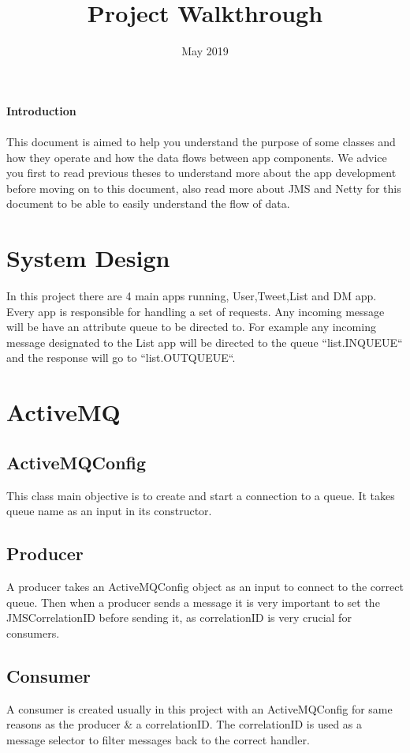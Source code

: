\documentclass{article}
\title{Project Walkthrough}
\date{May 2019}
\begin{document}
\maketitle

\paragraph{\huge Introduction}
\paragraph{}
This document is aimed to help you understand the purpose of some classes and how they operate and how the data flows between app components. We advice you first to read previous theses to understand more about the app development before moving on to this document, also read more about JMS and Netty for this document to be able to easily understand the flow of data.


\section{System Design}
In this project there are 4 main apps running, User,Tweet,List and DM app. Every app is responsible for handling a set of requests. Any incoming message will be have an attribute queue to be directed to. For example any incoming message designated to the List app will be directed to the queue ``list.INQUEUE`` and the response will go to ``list.OUTQUEUE``.

\section{ActiveMQ}
\subsection{ActiveMQConfig}
This class main objective is to create and start a connection to a queue. It takes queue name as an input in its constructor.

\subsection{Producer}
A producer takes an ActiveMQConfig object as an input to connect to the correct queue. Then when a producer sends a message it is very important to set the JMSCorrelationID before sending it, as correlationID is very crucial for consumers.

\subsection{Consumer}
A consumer is created usually in this project with an ActiveMQConfig for same reasons as the producer & a correlationID. The correlationID is used as a message selector to filter messages back to the correct handler.
\end{document}
